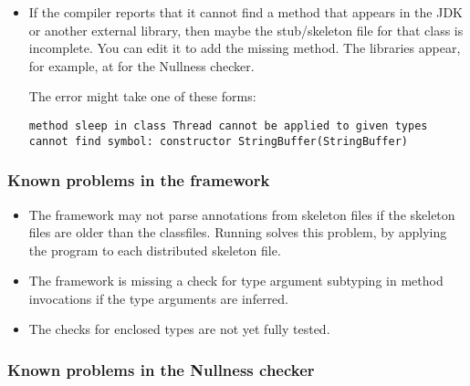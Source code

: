 \begin{itemize}
\item
If the compiler reports that it cannot find a method that appears in the
JDK or another external library, then maybe the stub/skeleton file for that
class is incomplete.  You can edit it to add the missing method.  The
libraries appear, for example, at  for the
Nullness checker.

The error might take one of these forms:

\begin{Verbatim}
method sleep in class Thread cannot be applied to given types
cannot find symbol: constructor StringBuffer(StringBuffer)
\end{Verbatim}


\end{itemize}


\subsubsection{Known problems in the framework\label{known-problems}}

\begin{itemize}

\item
  The framework may not parse annotations from skeleton files if the
  skeleton files are older than the classfiles.  Running  solves this problem, by applying the 
   program to each distributed skeleton file.

\item The framework is missing a check for type argument subtyping in
  method invocations if the type arguments are inferred.

\item The checks for enclosed types are not yet fully tested.

\end{itemize}

\subsubsection{Known problems in the Nullness checker}

